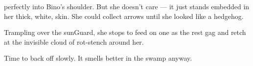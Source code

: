 perfectly into Bino's shoulder.
But she doesn't care --- it just stands embedded in her thick, white, skin.
She could collect arrows until she looked like a hedgehog.

Trampling over the \gls{sunGuard}, she stops to feed on one as the rest gag and retch at the invisible cloud of rot-stench around her.

Time to back off slowly.
It smells better in the swamp anyway.

\cyoaEnd
